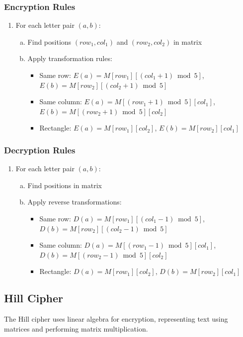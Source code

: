 \documentclass[titlepage]{article}
\begin{document}
\subsubsection{ Encryption Rules}
\begin{enumerate}[1.]
\item For each letter pair $(a,b)$:
   \begin{enumerate}[a)]
   \item Find positions $(row_1,col_1)$ and $(row_2,col_2)$ in matrix
   \item Apply transformation rules:
      \begin{itemize}
      \item Same row: $E(a) = M[row_1][(col_1+1)\bmod 5]$, $E(b) = M[row_2][(col_2+1)\bmod 5]$
      \item Same column: $E(a) = M[(row_1+1)\bmod 5][col_1]$, $E(b) = M[(row_2+1)\bmod 5][col_2]$
      \item Rectangle: $E(a) = M[row_1][col_2]$, $E(b) = M[row_2][col_1]$
      \end{itemize}
   \end{enumerate}
\end{enumerate}

\subsubsection{ Decryption Rules}
\begin{enumerate}[1.]
\item For each letter pair $(a,b)$:
   \begin{enumerate}[a)]
   \item Find positions in matrix
   \item Apply reverse transformations:
      \begin{itemize}
      \item Same row: $D(a) = M[row_1][(col_1-1)\bmod 5]$, $D(b) = M[row_2][(col_2-1)\bmod 5]$
      \item Same column: $D(a) = M[(row_1-1)\bmod 5][col_1]$, $D(b) = M[(row_2-1)\bmod 5][col_2]$
      \item Rectangle: $D(a) = M[row_1][col_2]$, $D(b) = M[row_2][col_1]$
      \end{itemize}
   \end{enumerate}
\end{enumerate}

\subsection{Hill Cipher}
The Hill cipher uses linear algebra for encryption, representing text using matrices and performing matrix multiplication.
\end{document}
